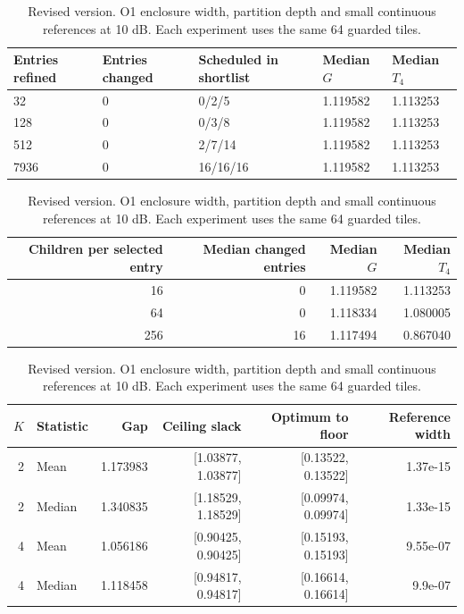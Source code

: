 \documentclass[10pt,letterpaper]{article}
\begin{document}
\begin{table}[p]\color{blue}\centering\small
\setlength{\tabcolsep}{4pt}
\caption{Revised version. O1 enclosure width, partition depth and small continuous references at 10 dB. Each experiment uses the same 64 guarded tiles.}\label{supp:refinement}
\begin{tabular}{lllll}\toprule
Entries refined & Entries changed & Scheduled in shortlist & Median $G$ & Median $T_4$\\
\midrule
32 & 0 & 0/2/5 & 1.119582 & 1.113253\\
128 & 0 & 0/3/8 & 1.119582 & 1.113253\\
512 & 0 & 2/7/14 & 1.119582 & 1.113253\\
7936 & 0 & 16/16/16 & 1.119582 & 1.113253\\
\bottomrule\end{tabular}
\par\medskip\begin{minipage}{\linewidth}\small
\par\smallskip\noindent\begin{tabular}{rrrr}\toprule Children per selected entry & Median changed entries & Median $G$ & Median $T_4$\\\midrule
16 & 0 & 1.119582 & 1.113253\\
64 & 0 & 1.118334 & 1.080005\\
256 & 16 & 1.117494 & 0.867040\\
\bottomrule\end{tabular}\par\smallskip
\noindent\begin{tabular}{rlrrrr}\toprule $K$ & Statistic & Gap & Ceiling slack & Optimum to floor & Reference width\\\midrule
2 & Mean & 1.173983 & [1.03877, 1.03877] & [0.13522, 0.13522] & 1.37e-15\\
2 & Median & 1.340835 & [1.18529, 1.18529] & [0.09974, 0.09974] & 1.33e-15\\
4 & Mean & 1.056186 & [0.90425, 0.90425] & [0.15193, 0.15193] & 9.55e-07\\
4 & Median & 1.118458 & [0.94817, 0.94817] & [0.16614, 0.16614] & 9.9e-07\\
\bottomrule\end{tabular}\par\smallskip

\end{minipage}
\end{table}
\end{document}

